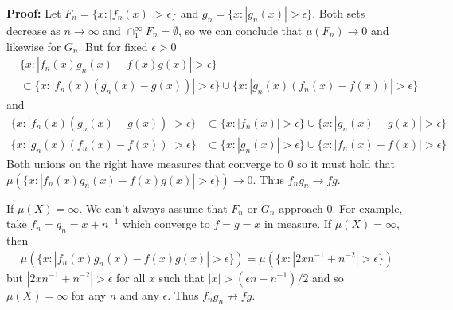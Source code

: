 \documentclass[11pt,letter]{article}
\begin{document}
\begin{enumerate}
\begin{enumerate}
        \textbf{Proof:} Let $F_n = \{x: |f_n(x)| > \epsilon\}$ and $g_n = \{x: |g_n(x)| > \epsilon\}$. Both sets decrease as $n \rightarrow \infty$ and $\cap_1^\infty F_n = \emptyset$, so we can conclude that $\mu(F_n) \rightarrow 0$ and likewise for $G_n$. But for fixed $\epsilon > 0$
        \begin{align*}
            & \{x: |f_n(x)g_n(x) - f(x)g(x)| > \epsilon\} \\
            & \subset \{x: |f_n(x)(g_n(x) - g(x))| > \epsilon\} \cup \{x: |g_n(x)(f_n(x) - f(x))| > \epsilon\}
        \end{align*}
        and
        \begin{align*}
            \{x: |f_n(x)(g_n(x) - g(x))| > \epsilon\} & \subset \{x: |f_n(x)| > \epsilon\} \cup \{x: |g_n(x) - g(x)| > \epsilon\} \\
            \{x: |g_n(x)(f_n(x) - f(x))| > \epsilon\} & \subset \{x: |g_n(x)| > \epsilon\} \cup \{x: |f_n(x) - f(x)| > \epsilon\}
        \end{align*}
        Both unions on the right have measures that converge to 0 so it must hold that \\ $\mu(\{x: |f_n(x)g_n(x) - f(x)g(x)| > \epsilon\}) \rightarrow 0$. Thus $f_ng_n \rightarrow fg$.

        If $\mu(X) = \infty$. We can't always assume that $F_n$ or $G_n$ approach 0. For example, take $f_n = g_n = x + n^{-1}$ which converge to $f = g = x$ in measure. If $\mu(X) = \infty$, then
        \begin{align*}
            \mu(\{x: |f_n(x)g_n(x) - f(x)g(x)| > \epsilon\}) = \mu(\{x: |2xn^{-1} + n^{-2}| > \epsilon\})
        \end{align*}
        but $|2xn^{-1} + n^{-2}| > \epsilon$ for all $x$ such that $|x| > (\epsilon n - n^{-1})/2$ and so $\mu(X) = \infty$ for any $n$ and any $\epsilon$. Thus $f_ng_n \not \rightarrow fg$.
    \end{enumerate}
\end{enumerate}
\end{document}

